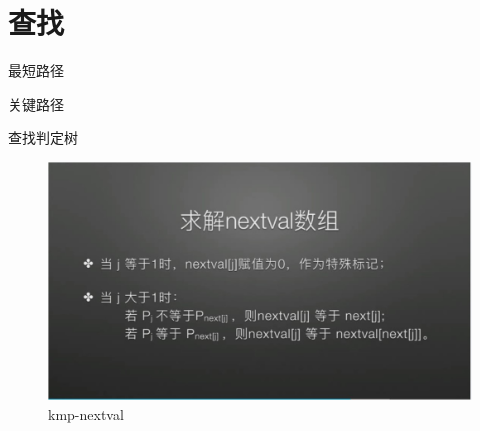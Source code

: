 \chapter*{查找}

最短路径

关键路径

查找判定树
\begin{figure}[h]
	\centering
	\includegraphics[scale=0.4]{images/cs/KMPnextval.jpg}
	\caption[kmp]{kmp-nextval}
\end{figure}
